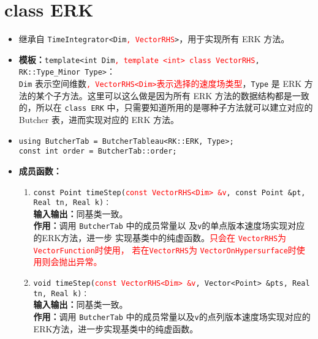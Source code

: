 \documentclass[a4paper,twoside]{ctexart}
\begin{document}
\section{class ERK}
\begin{itemize}
    \item 继承自 \texttt{TimeIntegrator<Dim}\textcolor{red}{\texttt{, VectorRHS}}\texttt{>}，用于实现所有 ERK 方法。
    \item \textbf{模板：}\texttt{template<int
        Dim}\textcolor{red}{\texttt{, template <int> class
          VectorRHS}}\texttt{, RK::Type\_Minor Type>}：\\\texttt{Dim}
      表示空间维数\textcolor{red}{\texttt{, VectorRHS<Dim>}表示选择的速度场类型}，\texttt{Type} 是 ERK 方法的某个子方法。这里可以这么做是因为所有 ERK 方法的数据结构都是一致的，所以在 \texttt{class ERK} 中，只需要知道所用的是哪种子方法就可以建立对应的 Butcher 表，进而实现对应的 ERK 方法。
    \item \texttt{using ButcherTab = ButcherTableau<RK::ERK, Type>;\\
    const int order = ButcherTab::order;}
    \item \textbf{成员函数：}
      \begin{enumerate}[(1)]
        \item 
          \texttt{const Point timeStep(}\textcolor{red}{\texttt{const VectorRHS<Dim> \&v}}\texttt{,
            const Point \&pt, Real tn, Real k)：}\\
          \textbf{输入输出：}同基类一致。\\
                \textbf{作用：}调用 \texttt{ButcherTab} 中的成员常量以
                及\texttt{v}的单点版本速度场实现对应的ERK方法，进一步
                实现基类中的纯虚函数。\textcolor{red}{只会在
                  \texttt{VectorRHS}为\texttt{VectorFunction}时使用，
                  若在\texttt{VectorRHS}为
                  \texttt{VectorOnHypersurface}时使用则会抛出异常。}
                \item \texttt{void timeStep(}\textcolor{red}{\texttt{const VectorRHS<Dim> \&v}}\texttt{, Vector<Point> \&pts, Real tn, Real k)：}\\
                \textbf{输入输出：}同基类一致。\\
                \textbf{作用：}调用 \texttt{ButcherTab} 中的成员常量以及\texttt{v}的点列版本速度场实现对应的ERK方法，进一步实现基类中的纯虚函数。
            \end{enumerate}
\end{itemize}
\end{document}
